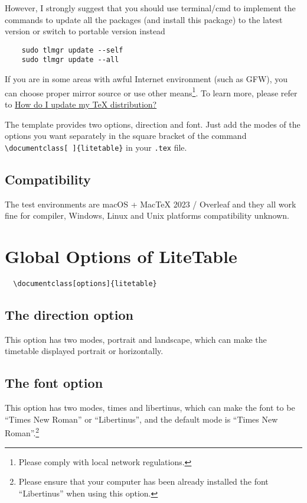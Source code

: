\documentclass[11pt]{article}
\def\pkg#1{\texorpdfstring{\textcolor{pkgcolor}{\textsf{#1}}}{“#1”}}
\def\mode#1{\texorpdfstring{\textcolor{moducolor}{\textsf{#1}}}{“#1”}}
\begin{document}
However, I strongly suggest that you should use terminal/cmd to implement the commands to update all the packages (and install this package) to the latest version or switch to portable version instead
\begin{verbatim}
    sudo tlmgr update --self
    sudo tlmgr update --all
\end{verbatim}

If you are in some areas with awful Internet environment (such as GFW), you can choose proper mirror source or use other means\footnote{Please comply with local network regulations.}. To learn more, please refer to \href{https://tex.stackexchange.com/questions/55437/how-do-i-update-my-tex-distribution}{How do I update my \TeX{} distribution?}

The template provides two options, \mode{direction} and \mode{font}. Just add the modes of the options you want separately in the square bracket of the command \verb|\documentclass[ ]{litetable}| in your \verb|.tex| file.

\subsection{Compatibility}
The test environments are macOS + Mac\TeX{} 2023 / Overleaf and they all work fine for \XeLaTeX{} compiler, Windows, Linux and Unix platforms compatibility unknown.

\section{Global Options of \pkg{LiteTable}}
\begin{verbatim}
  \documentclass[options]{litetable}
\end{verbatim}

\subsection{The \mode{direction} option}
This option has two modes, \mode{portrait} and \mode{landscape}, which can make the timetable displayed portrait or horizontally.

\subsection{The \mode{font} option}
This option has two modes, \mode{times} and \mode{libertinus}, which can make the font to be ``Times New Roman'' or ``Libertinus'', and the default mode is ``Times New Roman''.\footnote{Please ensure that your computer has been already installed the font ``Libertinus'' when using this option.}
\end{document}
